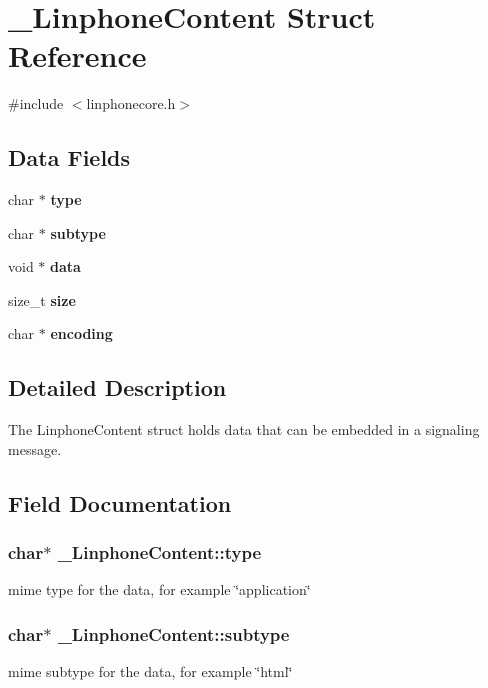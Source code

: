 \section{\-\_\-\-Linphone\-Content Struct Reference}
\label{struct__LinphoneContent}


{\ttfamily \#include $<$linphonecore.\-h$>$}

\subsection*{Data Fields}
\begin{DoxyCompactItemize}
\item 
char $\ast$ {\bf type}
\item 
char $\ast$ {\bf subtype}
\item 
void $\ast$ {\bf data}
\item 
size\-\_\-t {\bf size}
\item 
char $\ast$ {\bf encoding}
\end{DoxyCompactItemize}


\subsection{Detailed Description}
The Linphone\-Content struct holds data that can be embedded in a signaling message. 

\subsection{Field Documentation}
\subsubsection[{type}]{\setlength{\rightskip}{0pt plus 5cm}char$\ast$ \-\_\-\-Linphone\-Content\-::type}\label{struct__LinphoneContent_a8a86c24d70252b4c790085f8d5b94fdc}
mime type for the data, for example \char`\"{}application\char`\"{} 
\subsubsection[{subtype}]{\setlength{\rightskip}{0pt plus 5cm}char$\ast$ \-\_\-\-Linphone\-Content\-::subtype}\label{struct__LinphoneContent_a26cbb8fe30763eea41a5b84028dd1f9b}
mime subtype for the data, for example \char`\"{}html\char`\"{} 
